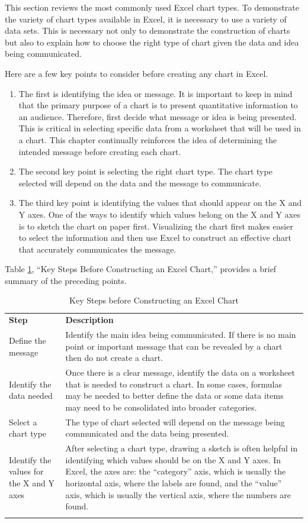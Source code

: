 This section reviews the most commonly used Excel chart types. To demonstrate the variety of chart types available in Excel, it is necessary to use a variety of data sets. This is necessary not only to demonstrate the construction of charts but also to explain how to choose the right type of chart given the data and idea being communicated.

Here are a few key points to consider before creating any chart in Excel.

\begin{enumerate}
	\item The first is identifying the idea or message. It is important to keep in mind that the primary purpose of a chart is to present quantitative information to an audience. Therefore, first decide what message or idea is being presented. This is critical in selecting specific data from a worksheet that will be used in a chart. This chapter continually reinforces the idea of determining the intended message before creating each chart.
	\item The second key point is selecting the right chart type. The chart type selected will depend on the data and the message to communicate.
	\item The third key point is identifying the values that should appear on the X and Y axes. One of the ways to identify which values belong on the X and Y axes is to sketch the chart on paper first. Visualizing the chart first makes easier to select the information and then use Excel to construct an effective chart that accurately communicates the message. 
\end{enumerate}

Table \ref{04:tab01}, ``Key Steps Before Constructing an Excel Chart,'' provides a brief summary of the preceding points.

{\small
	\begin{longtable}{p{0.75in}p{3.0in}} %
		\textbf{Step} & \textbf{Description} \endhead
		\hline \\
		Define the message & Identify the main idea being communicated. If there is no main point or important message that can be revealed by a chart then do not create a chart.\\
		Identify the data needed & Once there is a clear message, identify the data on a worksheet that is needed to construct a chart. In some cases, formulas may be needed to better define the data or some data items may need to be consolidated into broader categories.\\
		Select a chart type & The type of chart selected will depend on the message being communicated and the data being presented.\\
		Identify the values for the X and Y axes & After selecting a chart type, drawing a sketch is often helpful in identifying which values should be on the X and Y axes. In Excel, the axes are: the ``category'' axis, which is usually the horizontal axis, where the labels are found, and the ``value'' axis, which is usually the vertical axis, where the numbers are found.\\
		\caption{Key Steps before Constructing an Excel Chart}
		\label{04:tab01}
	\end{longtable}
}

